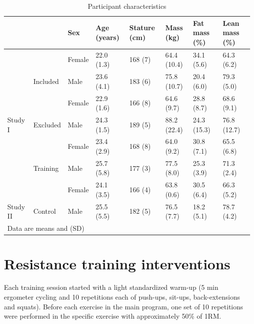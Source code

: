 \documentclass[twoside,10pt]{gihclass} %
\begin{document}
\begin{table}

\caption{\label{tab:characteristics-table}Participant characteristics}
\centering
\fontsize{7}{9}\selectfont
\begin{tabular}[t]{llllllll}
\toprule
  &   & Sex & Age (years) & Stature
(cm) & Mass (kg) & Fat mass (\%) & Lean mass (\%)\\
\midrule
 &  & Female & 22.0 (1.3) & 168 (7) & 64.4 (10.4) & 34.1 (5.6) & 64.3 (6.2)\\
\cmidrule{3-8}
 & \multirow{-2}{*}{\raggedright\arraybackslash Included} & Male & 23.6 (4.1) & 183 (6) & 75.8 (10.7) & 20.4 (6.0) & 79.3 (5.0)\\
\cmidrule{2-8}
 &  & Female & 22.9 (1.6) & 166 (8) & 64.6 (9.7) & 28.8 (8.7) & 68.6 (9.1)\\
\cmidrule{3-8}
\multirow{-4}{*}{\raggedright\arraybackslash Study I} & \multirow{-2}{*}{\raggedright\arraybackslash Excluded} & Male & 24.3 (1.5) & 189 (5) & 88.2 (22.4) & 24.3 (15.3) & 76.8 (12.7)\\
\cmidrule{1-8}
 &  & Female & 23.4 (2.9) & 168 (8) & 64.0 (9.2) & 30.8 (7.1) & 65.5 (6.8)\\
\cmidrule{3-8}
 & \multirow{-2}{*}{\raggedright\arraybackslash Training} & Male & 25.7 (5.8) & 177 (3) & 77.5 (8.0) & 25.3 (3.9) & 71.3 (2.4)\\
\cmidrule{2-8}
 &  & Female & 24.1 (3.5) & 166 (4) & 63.8 (0.6) & 30.5 (6.4) & 66.3 (5.2)\\
\cmidrule{3-8}
\multirow{-4}{*}{\raggedright\arraybackslash Study II} & \multirow{-2}{*}{\raggedright\arraybackslash Control} & Male & 25.5 (5.5) & 182 (5) & 76.5 (7.7) & 18.2 (5.1) & 78.7 (4.2)\\
\bottomrule
\multicolumn{8}{l}{\rule{0pt}{1em}Data are means and (SD)}\\
\end{tabular}
\end{table}
\hypertarget{resistance-training-interventions}{%
\section{Resistance training interventions}\label{resistance-training-interventions}}

Each training session started with a light standardized warm-up (5 min
ergometer cycling and 10 repetitions each of push-ups, sit-ups,
back-extensions and squats). Before each exercise in the main program,
one set of 10 repetitions were performed in the specific exercise with
approximately 50\% of 1RM.
\end{document}
